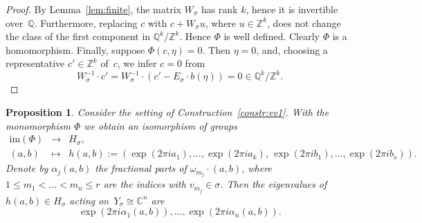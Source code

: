 \documentclass{amsart}
\newcommand{\C}{\mathbb{C}}
\newcommand{\Q}{\mathbb{Q}}
\newcommand{\Z}{\mathbb{Z}}
\theoremstyle{plain}
\newtheorem{proposition}[theorem]{Proposition}
\theoremstyle{definition}
\begin{document}
\begin{proof}
By Lemma~\ref{lem:finite}, the matrix $W_\sigma$ has rank $k$,
hence it is invertible over~$\Q$.
Furthermore, replacing $c$ with $c+W_\sigma u$, where $u\in\Z^k$,
does not change the class of the first component in $\Q^k/\Z^k$.
Hence $\Phi$ is well defined. Clearly $\Phi$ is a homomorphism.
Finally, suppose $\Phi(c,\eta)=0$. Then $\eta=0$, and,
choosing a representative $c' \in \Z^k$ of~$c$, we infer
$c=0$ from
$$
W_\sigma^{-1} \cdot c'  = W_\sigma^{-1}\cdot \left(c'-E_\sigma \cdot b(\eta)\right) = 0 \in \Q^k/\Z^k.
$$
\end{proof}


\begin{proposition}\label{prop:eigenvals}
Consider the setting of Construction~\ref{constr:ev1}.   
With the monomorphism $\Phi$ we obtain an isomorphism of groups
$$
\begin{array}{rcl}
\mathrm{im}(\Phi) & \to & H_\sigma,
\\[5pt]                                                     
(a,b) & \mapsto & h(a,b) := (\exp(2 \pi i a_1), \ldots, \exp(2 \pi i a_k), \, \exp(2 \pi i b_1), \ldots, \exp(2 \pi i b_s)).
\end{array}
$$
Denote by $\alpha_j(a,b)$ the fractional parts of $\omega_{m_j} \cdot (a,b)$,
where $1 \le m_1 < \ldots < m_n \le r$ are the indices with $v_{m_j} \in \sigma$.
Then the eigenvalues of $h(a,b) \in H_\sigma$ acting on~$Y_\sigma \cong \C^n$ are
$$
\exp(2 \pi i \alpha_1(a,b)), \ldots, \exp(2 \pi i \alpha_n(a,b)).
$$
\end{proposition}
\end{document}
